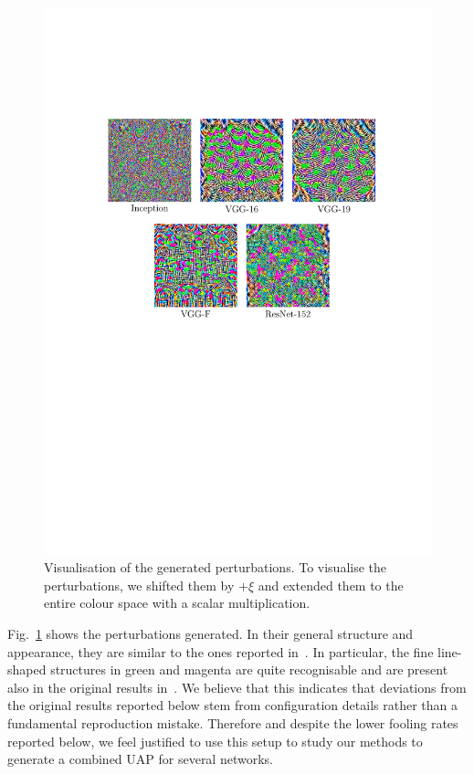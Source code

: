 \documentclass[runningheads]{llncs}
\begin{document}
\begin{figure}[t]
	\centering
	\includegraphics[clip, trim=3.8cm 12.8cm 2.8cm 5.8cm, width=1.0\textwidth]{plots_generierung/perturbationsFigure.pdf}
	\caption{Visualisation of the generated perturbations. To visualise the perturbations, we shifted them by $+\xi$ and extended them to the entire colour space with a scalar multiplication.}\label{fig_stoerwerte}
\end{figure}

Fig.~\ref{fig_stoerwerte} shows the perturbations generated. In their general structure and appearance, they are similar to the ones reported in~\cite{moosavidezfooli_universal_2017}. In particular, the fine line-shaped structures in green and magenta are quite recognisable and are present also in the original results in~\cite{moosavidezfooli_universal_2017}. We believe that this indicates that deviations from the original results reported below stem from configuration details rather than a fundamental reproduction mistake. Therefore and despite the lower fooling rates reported below, we feel justified to use this setup to study our methods to generate a combined UAP for several networks. 
\end{document}
